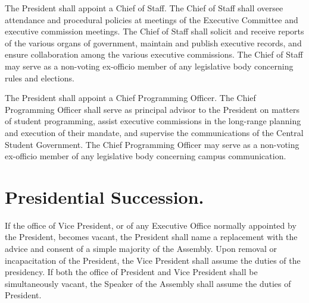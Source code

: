     The President shall appoint a Chief of Staff. The Chief of Staff shall oversee attendance and procedural policies at meetings of the Executive Committee and executive commission meetings. The Chief of Staff shall solicit and receive reports of the various organs of government, maintain and publish executive records, and ensure collaboration among the various executive commissions. The Chief of Staff may serve as a non-voting ex-officio member of any legislative body concerning rules and elections.

    The President shall appoint a Chief Programming Officer. The Chief Programming Officer shall serve as principal advisor to the President on matters of student programming, assist executive commissions in the long-range planning and execution of their mandate, and supervise the communications of the Central Student Government. The Chief Programming Officer may serve as a non-voting ex-officio member of any legislative body concerning campus communication.

\section{Presidential Succession.}
    If the office of Vice President, or of any Executive Office normally appointed by the President, becomes vacant, the President shall name a replacement with the advice and consent of a simple majority of the Assembly. Upon removal or incapacitation of the President, the Vice President shall assume the duties of the presidency. If both the office of President and Vice President shall be simultaneously vacant, the Speaker of the Assembly shall assume the duties of President.
